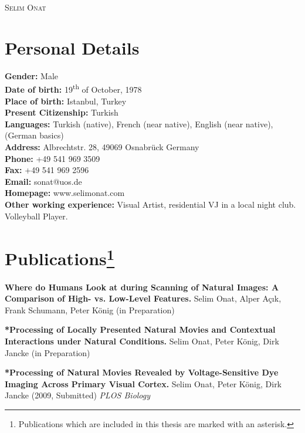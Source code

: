 \begin{center}

\Large{\textsc{Selim Onat}}
\end{center}


\section*{Personal Details}
\begin{flushleft}
  \textbf{Gender:} Male \\
  \textbf{Date of birth:} 19\textsuperscript{th} of October, 1978\\
  \textbf{Place of birth:} Istanbul, Turkey \\
  \textbf{Present Citizenship:} Turkish \\
  \textbf{Languages:} Turkish (native), French (near native), English (near
  native), (German  basics)\\
  \textbf{Address:} Albrechtstr. 28, 49069 Osnabr\"uck Germany\\
  \textbf{Phone:} +49 541 969 3509 \\
  \textbf{Fax:} +49 541 969 2596 \\
  \textbf{Email:} sonat@uos.de \\
  \textbf{Homepage:} www.selimonat.com\\
  \textbf{Other working experience:} Visual Artist, residential VJ in a local night
  club. Volleyball Player. \end{flushleft}

\section*{Publications\footnote{Publications which are included in this
thesis are marked with an asterisk.}} 


\textbf{Where do Humans Look at during Scanning of Natural Images: A
Comparison of High- vs. Low-Level Features.} Selim Onat, Alper A\c{c}{\i}k,
Frank Schumann, Peter K\"onig (in Preparation)

\textbf{*Processing of Locally Presented Natural Movies and Contextual
Interactions under Natural Conditions.} Selim Onat, Peter K\"onig, Dirk
Jancke (in Preparation)


\textbf{*Processing of Natural Movies Revealed by Voltage-Sensitive Dye
Imaging Across Primary Visual Cortex. } Selim Onat, Peter K\"onig, Dirk
Jancke (2009, Submitted) \textit{PLOS Biology}


